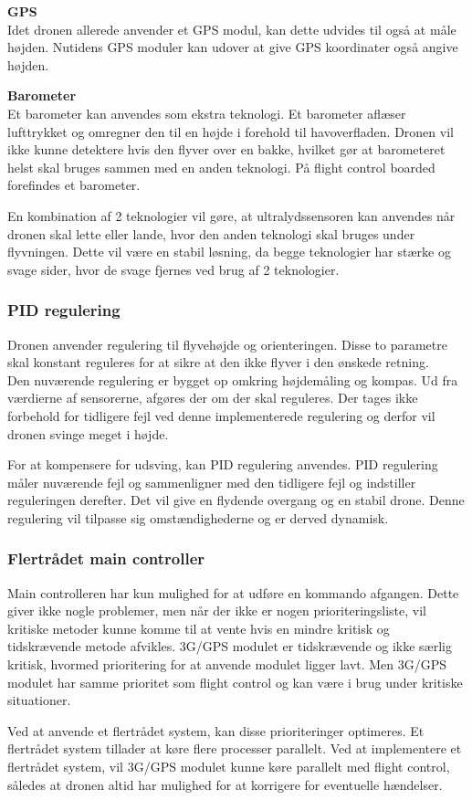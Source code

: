 \textbf{GPS}\\
Idet dronen allerede anvender et GPS modul, kan dette udvides til også at måle højden. Nutidens GPS moduler kan udover at give GPS koordinater også angive højden.

\textbf{Barometer}\\ 
Et barometer kan anvendes som ekstra teknologi. Et barometer aflæser lufttrykket og omregner den til en højde i forehold til havoverfladen. Dronen vil ikke kunne detektere hvis den flyver over en bakke, hvilket gør at barometeret helst skal bruges sammen med en anden teknologi. På flight control boarded forefindes et barometer. 


En kombination af 2 teknologier vil gøre, at ultralydssensoren kan anvendes når dronen skal lette eller lande, hvor den anden teknologi skal bruges under flyvningen. Dette vil være en stabil løsning, da begge teknologier har stærke og svage sider, hvor de svage fjernes ved brug af 2 teknologier.

\subsubsection*{PID regulering}

Dronen anvender regulering til flyvehøjde og orienteringen. Disse to parametre skal konstant reguleres for at sikre at den ikke flyver i den ønskede retning. \\
Den nuværende regulering er bygget op omkring højdemåling og kompas. Ud fra værdierne af sensorerne, afgøres der om der skal reguleres. Der tages ikke forbehold for tidligere fejl ved denne implementerede regulering og derfor vil dronen svinge meget i højde.

For at kompensere for udsving, kan PID regulering anvendes. PID regulering måler nuværende fejl og sammenligner med den tidligere fejl og indstiller reguleringen derefter. Det vil give en flydende overgang og en stabil drone. Denne regulering vil tilpasse sig omstændighederne og er derved dynamisk.

\subsubsection*{Flertrådet main controller}

Main controlleren har kun mulighed for at udføre en kommando afgangen. Dette giver ikke nogle problemer, men når der ikke er nogen prioriteringsliste, vil kritiske metoder kunne komme til at vente hvis en mindre kritisk og tidskrævende metode afvikles. 
3G/GPS modulet er tidskrævende og ikke særlig kritisk, hvormed prioritering for at anvende modulet ligger lavt. Men 3G/GPS modulet har samme prioritet som flight control og kan være i brug under kritiske situationer. 

Ved at anvende et flertrådet system, kan disse prioriteringer optimeres. Et flertrådet system tillader at køre flere processer parallelt. Ved at implementere et flertrådet system, vil 3G/GPS modulet kunne køre parallelt med flight control, således at dronen altid har mulighed for at korrigere for eventuelle hændelser. 


